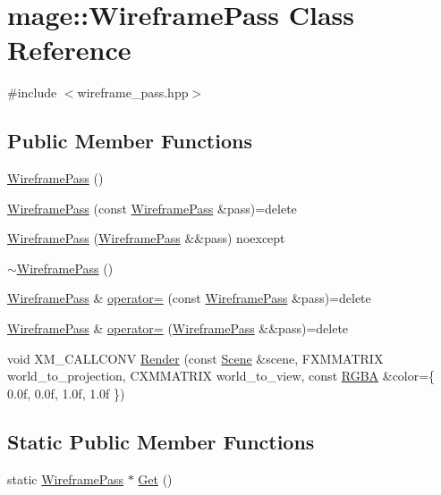 \hypertarget{classmage_1_1_wireframe_pass}{}\section{mage\+:\+:Wireframe\+Pass Class Reference}
\label{classmage_1_1_wireframe_pass}


{\ttfamily \#include $<$wireframe\+\_\+pass.\+hpp$>$}

\subsection*{Public Member Functions}
\begin{DoxyCompactItemize}
\item 
\hyperlink{classmage_1_1_wireframe_pass_a7323b3caca5d06a068a89c0333651f04}{Wireframe\+Pass} ()
\item 
\hyperlink{classmage_1_1_wireframe_pass_ac0410afcafa22b8cd50c1a6e19c44c3e}{Wireframe\+Pass} (const \hyperlink{classmage_1_1_wireframe_pass}{Wireframe\+Pass} \&pass)=delete
\item 
\hyperlink{classmage_1_1_wireframe_pass_afb86ef997be4e3a204ead228d6533519}{Wireframe\+Pass} (\hyperlink{classmage_1_1_wireframe_pass}{Wireframe\+Pass} \&\&pass) noexcept
\item 
\hyperlink{classmage_1_1_wireframe_pass_a186e4dd37ac17382872180385ec4dca1}{$\sim$\+Wireframe\+Pass} ()
\item 
\hyperlink{classmage_1_1_wireframe_pass}{Wireframe\+Pass} \& \hyperlink{classmage_1_1_wireframe_pass_a05d891aae7dae2e222f94fe495651615}{operator=} (const \hyperlink{classmage_1_1_wireframe_pass}{Wireframe\+Pass} \&pass)=delete
\item 
\hyperlink{classmage_1_1_wireframe_pass}{Wireframe\+Pass} \& \hyperlink{classmage_1_1_wireframe_pass_a62a5a2a49a9e8abcedc864dda0c43162}{operator=} (\hyperlink{classmage_1_1_wireframe_pass}{Wireframe\+Pass} \&\&pass)=delete
\item 
void X\+M\+\_\+\+C\+A\+L\+L\+C\+O\+NV \hyperlink{classmage_1_1_wireframe_pass_ae6f748fdfccd48c0d9d1abb5b5485367}{Render} (const \hyperlink{classmage_1_1_scene}{Scene} \&scene, F\+X\+M\+M\+A\+T\+R\+IX world\+\_\+to\+\_\+projection, C\+X\+M\+M\+A\+T\+R\+IX world\+\_\+to\+\_\+view, const \hyperlink{structmage_1_1_r_g_b_a}{R\+G\+BA} \&color=\{ 0.\+0f, 0.\+0f, 1.\+0f, 1.\+0f \})
\end{DoxyCompactItemize}
\subsection*{Static Public Member Functions}
\begin{DoxyCompactItemize}
\item 
static \hyperlink{classmage_1_1_wireframe_pass}{Wireframe\+Pass} $\ast$ \hyperlink{classmage_1_1_wireframe_pass_ace5168eac9d32c1bfa71df3411960f48}{Get} ()
\end{DoxyCompactItemize}

